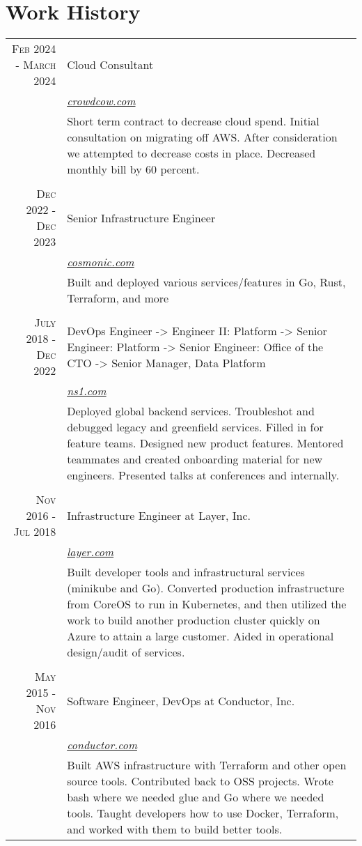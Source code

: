 \documentclass[a4paper, 10pt, onepage]{article} %
\begin{document}
\section{Work History}
\begin{tabular}{r|p{10cm}}
\textsc{Feb 2024 - March 2024} & {Cloud Consultant}\\
&\small\emph{\href{https://crowdcow.com}{crowdcow.com}}\\
&\footnotesize{Short term contract to decrease cloud spend. Initial consultation on migrating off AWS. After consideration we attempted to decrease costs in place. Decreased monthly bill by 60 percent.}\\

\multicolumn{2}{c}{}\\
\textsc{Dec 2022 - Dec 2023} & {Senior Infrastructure Engineer}\\
&\small\emph{\href{https://cosmonic.com}{cosmonic.com}}\\
&\footnotesize{Built and deployed various services/features in Go, Rust, Terraform, and more}\\

\multicolumn{2}{c}{}\\
\textsc{July 2018 - Dec 2022} & {DevOps Engineer -> Engineer II: Platform -> Senior Engineer: Platform -> Senior Engineer: Office of the CTO -> Senior Manager, Data Platform}\\
&\small\emph{\href{https://ns1.com}{ns1.com}}\\
&\footnotesize{Deployed global backend services. Troubleshot and debugged legacy and greenfield services. Filled in for feature teams. Designed new product features. Mentored teammates and created onboarding material for new engineers. Presented talks at conferences and internally.}\\

\multicolumn{2}{c}{}\\
\textsc{Nov 2016 - Jul 2018} & {Infrastructure Engineer at Layer, Inc.}\\
&\small\emph{\href{https://layer.com}{layer.com}}\\
&\footnotesize{Built developer tools and infrastructural services (minikube and Go). Converted production infrastructure from CoreOS to run in Kubernetes, and then utilized the work to build another production cluster quickly on Azure to attain a large customer. Aided in operational design/audit of services.}\\

\multicolumn{2}{c}{}\\
\textsc{May 2015 - Nov 2016} & {Software Engineer, DevOps at Conductor, Inc.}\\
&\small\emph{\href{https://conductor.com}{conductor.com}}\\
&\footnotesize{Built AWS infrastructure with Terraform and other open source tools. Contributed back to OSS projects. Wrote bash where we needed glue and Go where we needed tools. Taught developers how to use Docker, Terraform, and worked with them to build better tools.}\\


\end{tabular}
\end{document}

